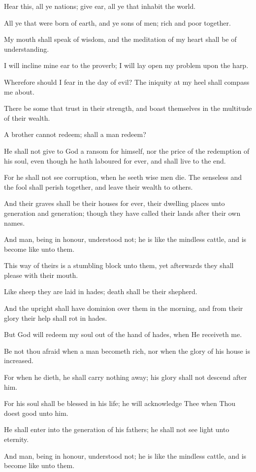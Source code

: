 Hear this, all ye nations; give ear, all ye that inhabit the world.

All ye that were born of earth, and ye sons of men; rich and poor together.

My mouth shall speak of wisdom, and the meditation of my heart shall be of understanding.

I will incline mine ear to the proverb; I will lay open my problem upon the harp.

Wherefore should I fear in the day of evil? The iniquity at my heel shall compass me about.

There be some that trust in their strength, and boast themselves in the multitude of their wealth.

A brother cannot redeem; shall a man redeem?

He shall not give to God a ransom for himself, nor the price of the redemption of his soul, even though he hath laboured for ever, and shall live to the end.

For he shall not see corruption, when he seeth wise men die. The senseless and the fool shall perish together, and leave their wealth to others.

And their graves shall be their houses for ever, their dwelling places unto generation and generation; though they have called their lands after their own names.

And man, being in honour, understood not; he is like the mindless cattle, and is become like unto them.

This way of theirs is a stumbling block unto them, yet afterwards they shall please with their mouth.

Like sheep they are laid in hades; death shall be their shepherd.

And the upright shall have dominion over them in the morning, and from their glory their help shall rot in hades.

But God will redeem my soul out of the hand of hades, when He receiveth me.

Be not thou afraid when a man becometh rich, nor when the glory of his house is increased.

For when he dieth, he shall carry nothing away; his glory shall not descend after him.

For his soul shall be blessed in his life; he will acknowledge Thee when Thou doest good unto him.

He shall enter into the generation of his fathers; he shall not see light unto eternity.

And man, being in honour, understood not; he is like the mindless cattle, and is become like unto them.
